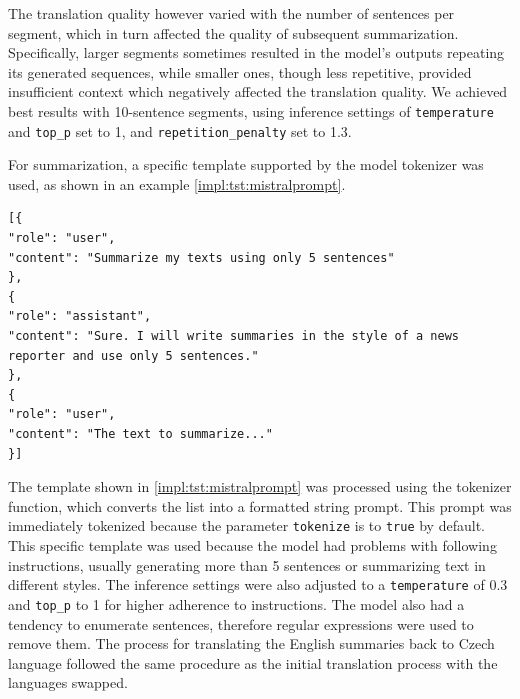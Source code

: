 \documentclass[english, ba, kiv, he, iso690numb, pdf, viewonly]{fasthesis}
\begin{document}
The translation quality however varied with the number of sentences per segment, which in turn affected the quality of subsequent summarization. Specifically, larger segments sometimes resulted in the model's outputs repeating its generated sequences, while smaller ones, though less repetitive, provided insufficient context which negatively affected the translation quality. We achieved best results with 10-sentence segments, using inference settings of \texttt{temperature} and \texttt{top\_p} set to 1, and \texttt{repetition\_penalty} set to 1.3.

For summarization, a specific template supported by the model tokenizer was used, as shown in an example \ref{impl:tst:mistralprompt}.

\lstset{style=FASThesisLstStyle,} %
\begin{lstlisting}[caption={Summarization template for TST\label{impl:tst:mistralprompt}}] 
[{
"role": "user",
"content": "Summarize my texts using only 5 sentences"
},
{
"role": "assistant",
"content": "Sure. I will write summaries in the style of a news reporter and use only 5 sentences."
},
{
"role": "user",
"content": "The text to summarize..."
}]    
\end{lstlisting}
The template shown in \ref{impl:tst:mistralprompt} was processed using the tokenizer  function, which converts the list into a formatted string prompt. This prompt was immediately tokenized because the parameter \texttt{tokenize} is to \texttt{true} by default. This specific template was used because the model had problems with following instructions, usually generating more than 5 sentences or summarizing text in different styles. The inference settings were also adjusted to a \texttt{temperature} of 0.3 and \texttt{top\_p} to 1 for higher adherence to instructions. The model also had a tendency to enumerate sentences, therefore regular expressions were used to remove them. The process for translating the English summaries back to Czech language followed the same procedure as the initial translation process with the languages swapped.
\end{document}
